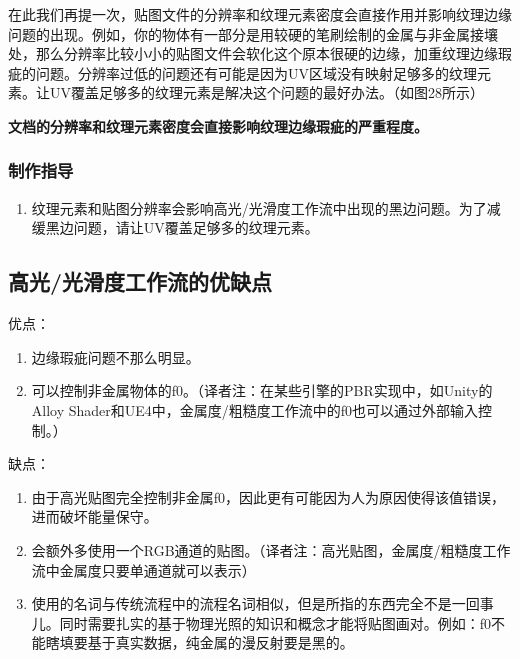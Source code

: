 在此我们再提一次，贴图文件的分辨率和纹理元素密度会直接作用并影响纹理边缘问题的出现。例如，你的物体有一部分是用较硬的笔刷绘制的金属与非金属接壤处，那么分辨率比较小小的贴图文件会软化这个原本很硬的边缘，加重纹理边缘瑕疵的问题。分辨率过低的问题还有可能是因为UV区域没有映射足够多的纹理元素。让UV覆盖足够多的纹理元素是解决这个问题的最好办法。（如图28所示）

\textbf{文档的分辨率和纹理元素密度会直接影响纹理边缘瑕疵的严重程度。}

\subsubsection{制作指导}

\begin{enumerate}
\item 纹理元素和贴图分辨率会影响高光/光滑度工作流中出现的黑边问题。为了减缓黑边问题，请让UV覆盖足够多的纹理元素。
\end{enumerate}

\subsection{高光/光滑度工作流的优缺点}

优点：

\begin{enumerate}
\item 边缘瑕疵问题不那么明显。
\item 可以控制非金属物体的f0。（译者注：在某些引擎的PBR实现中，如Unity的Alloy Shader和UE4中，金属度/粗糙度工作流中的f0也可以通过外部输入控制。）
\end{enumerate}

缺点：

\begin{enumerate}
\item 由于高光贴图完全控制非金属f0，因此更有可能因为人为原因使得该值错误，进而破坏能量保守。
\item 会额外多使用一个RGB通道的贴图。（译者注：高光贴图，金属度/粗糙度工作流中金属度只要单通道就可以表示）
\item 使用的名词与传统流程中的流程名词相似，但是所指的东西完全不是一回事儿。同时需要扎实的基于物理光照的知识和概念才能将贴图画对。例如：f0不能瞎填要基于真实数据，纯金属的漫反射要是黑的。
\end{enumerate}